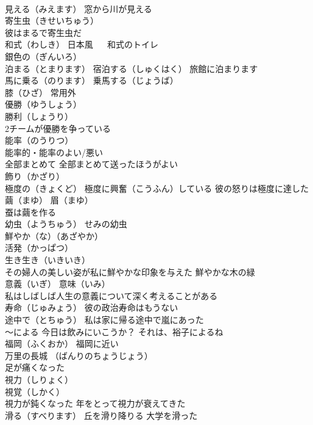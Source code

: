\documentclass[8pt]{extreport}
\begin{document}
\begin{CJK}{UTF8}{min}
\\	見える（みえます） 窓から川が見える
\\	寄生虫（きせいちゅう） 
\\	彼はまるで寄生虫だ
\\	和式（わしき） 日本風 　 和式のトイレ
\\	銀色の（ぎんいろ）
\\	泊まる（とまります） 宿泊する（しゅくはく） 旅館に泊まります
\\	馬に乗る（のります） 乗馬する（じょうば）
\\	膝（ひざ） 常用外
\\	優勝（ゆうしょう）
\\	勝利（しょうり）
\\	2チームが優勝を争っている
\\	能率（のうりつ） 
\\	能率的・能率のよい/悪い 
\\	全部まとめて 全部まとめて送ったほうがよい
\\	飾り（かざり）
\\	極度の（きょくど） 極度に興奮（こうふん）している 彼の怒りは極度に達した
\\	繭（まゆ） 眉（まゆ）
\\	蚕は繭を作る
\\	幼虫（ようちゅう） せみの幼虫
\\	鮮やか（な）（あざやか）
\\	活発（かっぱつ）
\\	生き生き（いきいき）
\\	その婦人の美しい姿が私に鮮やかな印象を与えた 鮮やかな木の緑
\\	意義（いぎ） 意味（いみ）
\\	私はしばしば人生の意義について深く考えることがある
\\	寿命（じゅみょう） 彼の政治寿命はもうない
\\	途中で（とちゅう） 私は家に帰る途中で嵐にあった
\\	～による 今日は飲みにいこうか？ それは、裕子によるね
\\	福岡（ふくおか） 福岡に近い
\\	万里の長城 （ばんりのちょうじょう）
\\	足が痛くなった
\\	視力（しりょく）
\\	視覚（しかく）
\\	視力が鈍くなった 年をとって視力が衰えてきた
\\	滑る（すべります） 丘を滑り降りる 大学を滑った

\end{CJK}
\end{document}
